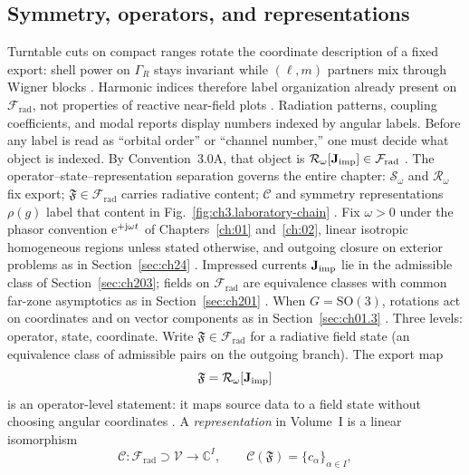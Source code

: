 \subsection{Symmetry, operators, and representations}
\label{sec:ch301}
Turntable cuts on compact ranges rotate the coordinate description of a fixed export: shell power on $\Gamma_R$ stays invariant while $(\ell,m)$ partners mix through Wigner blocks \cite{stratton1941,belinfante1940}. Harmonic indices therefore label organization already present on $\mathcal{F}_{\mathrm{rad}}$, not properties of reactive near-field plots \cite{jackson1999,hansen1988}.
Radiation patterns, coupling coefficients, and modal reports display numbers indexed by angular labels. Before any label is read as ``orbital order'' or ``channel number,'' one must decide what object is indexed. By Convention~3.0A, that object is \(\mathcal{R}_\omega[\mathbf{J}_{\mathrm{imp}}]\in\mathcal{F}_{\mathrm{rad}}\) \cite{stratton1941}. The operator--state--representation separation governs the entire chapter: \(\mathcal{S}_\omega\) and \(\mathcal{R}_\omega\) fix export; \(\mathfrak{F}\in\mathcal{F}_{\mathrm{rad}}\) carries radiative content; \(\mathcal{C}\) and symmetry representations \(\rho(g)\) label that content in Fig.~\ref{fig:ch3.laboratory-chain} \cite{jackson1999}.
Fix \(\omega>0\) under the phasor convention $\mathrm{e}^{+\mathrm{j}\omega t}$ of Chapters~\ref{ch:01} and~\ref{ch:02}, linear isotropic homogeneous regions unless stated otherwise, and outgoing closure on exterior problems as in Section~\ref{sec:ch24} \cite{stratton1941}. Impressed currents \(\mathbf{J}_{\mathrm{imp}}\) lie in the admissible class of Section~\ref{sec:ch203}; fields on \(\mathcal{F}_{\mathrm{rad}}\) are equivalence classes with common far-zone asymptotics as in Section~\ref{sec:ch201} \cite{harrington2001}. When \(G=\mathrm{SO}(3)\), rotations act on coordinates and on vector components as in Section~\ref{sec:ch01.3} \cite{jackson1999}.
Three levels: operator, state, coordinate. Write \(\mathfrak{F}\in\mathcal{F}_{\mathrm{rad}}\) for a radiative field state (an equivalence class of admissible pairs on the outgoing branch). The export map
\begin{equation}
\label{eq:ch3.state-from-source}
\mathfrak{F}
=
\mathcal{R}_\omega[\mathbf{J}_{\mathrm{imp}}]
\end{equation}
is an operator-level statement: it maps source data to a field state without choosing angular coordinates \cite{stratton1941}. A \emph{representation} in Volume~I is a linear isomorphism
\begin{equation}
\label{eq:ch3.representation-map}
\mathcal{C}:\mathcal{F}_{\mathrm{rad}}\supset\mathcal{V}
\longrightarrow
\mathbb{C}^{I},
\qquad
\mathcal{C}(\mathfrak{F})=\{c_\alpha\}_{\alpha\in I},
\end{equation}
